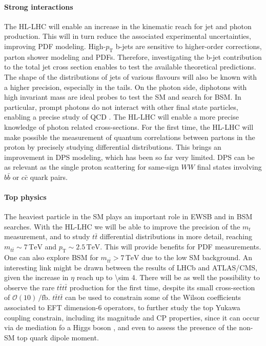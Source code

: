 \documentclass[11pt]{article}
\newcommand{\mtt}{m_{t\bar{t}}}
\newcommand{\mt}{m_{t}}
\newcommand{\pt}{p_{\text{T}}}
\begin{document}
\paragraph{Strong interactions}

The \ac{HL-LHC} will enable an increase in the kinematic reach for jet and photon production.
This will in turn reduce the associated experimental uncertainties, improving \ac{PDF} modeling.
High-\(\pt\) b-jets are sensitive to higher-order corrections, parton shower modeling and \acp{PDF}.
Therefore, investigating the b-jet contribution to the total jet cross section enables to test the available theoretical predictions.
The shape of the distributions of jets of various flavours will also be known with a higher precision, especially in the tails.
On the photon side, diphotons with high invariant mass are ideal probes to test the \ac{SM} and search for \ac{BSM}. In particular, prompt photons do not interact with other final state particles, enabling a precise study of \ac{QCD} \cite{diphoton_cdf}.
The \ac{HL-LHC} will enable a more precise knowledge of photon related cross-sections.
For the first time, the \ac{HL-LHC} will make possible the measurement of quantum correlations between partons in the proton by precisely studying differential distributions.
This brings an improvement in \ac{DPS} modeling, which has been so far very limited.
\ac{DPS} can be as relevant as the single proton scattering for same-sign \(WW\) final states involving \(b\bar{b}\) or \(c\bar{c}\) quark pairs.

\paragraph{Top physics}
The heaviest particle in the \ac{SM} plays an important role in \ac{EWSB} and in \ac{BSM} searches.
With the \ac{HL-LHC} we will be able to improve the precision of the \(\mt\) measurement, and to study \(t\bar{t}\) differential distributions in more detail, reaching \(\mtt\sim 7\,\si{\TeV}\) and \(\pt\sim 2.5\,\si{\TeV}\).
This will provide benefits for \ac{PDF} measurements.
One can also explore \ac{BSM} for \(\mtt > 7\,\si{\TeV}\) due to the low \ac{SM} background.
An interesting link might be drawn between the results of \ac{LHCb} and \ac{ATLAS}/\ac{CMS}, given the increase in \(\eta\) reach up to \num{\sim 4}.
There will be as well the possibility to observe the rare \(t\bar{t}t\bar{t}\) production for the first time, despite its small cross-section of \(\mathcal{O}(10)\,\si{\per\femto\barn}\).
\(t\bar{t}t\bar{t}\) can be used to constrain some of the Wilson coefficients associated to \ac{EFT} dimension-6 operators, to further study the top Yukawa coupling constrain, including its magnitude and \ac{CP} properties, since it can occur via de mediation fo a Higgs boson \cite{tttt}, and even to assess the presence of the non-\ac{SM} top quark dipole moment.
\end{document}
